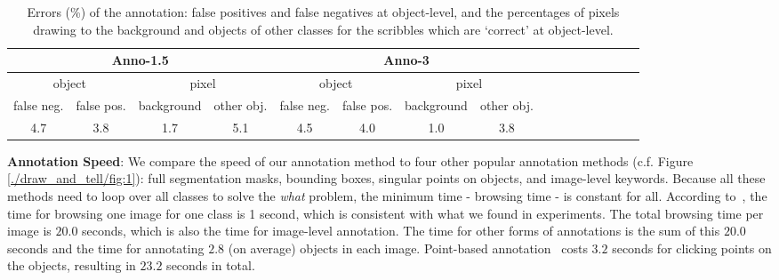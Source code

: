 \begin{table}[tb] %
\setlength\tabcolsep{1mm}
   \centering \small
  \begin{tabular}{|c|c|c|c|c|c|c|c|c|c|c|c|c|c|c|c|}  
    \hline \multicolumn{4}{|c|}{Anno-1.5} & \multicolumn{4}{c|}{Anno-3}  \\ \hline
     \multicolumn{2}{|c|}{object} & \multicolumn{2}{c|}{pixel} & \multicolumn{2}{c|}{object} & \multicolumn{2}{c|}{pixel} \\ \hline
      false neg. & false pos. & background  & other obj. & false neg. & false pos. & background  & other obj.   \\ \hline
     4.7   & 3.8 &     1.7          & 5.1   &  4.5   & 4.0 &     1.0            & 3.8  \\  \hline
       \end{tabular}
       \caption{Errors (\%) of the annotation: false positives and false negatives  at object-level, and the percentages of pixels drawing to the background and objects of other classes for the scribbles which are `correct' at object-level. 
}
    \label{table:anno}         
   \end{table}



\textbf{Annotation Speed}: We compare the speed of our annotation
method to four other popular annotation methods
(c.f. Figure \ref{./draw_and_tell/fig:1}): full segmentation masks, bounding boxes,
singular points on objects, and image-level keywords.  Because all these
methods need to loop over all classes to solve the \emph{what}
problem, the minimum time - browsing time - is constant for
all. According to~\citep{whatpoint}, the time for browsing one image
for one class is 1 second, which is consistent with what we found
in experiments. 
The total browsing time per image is  $20.0$ seconds, which is also the time for
image-level annotation.  The time for other forms of annotations is
the sum of this $20.0$ seconds and the time for annotating $2.8$ (on
average) objects in each image. Point-based
annotation~\citep{whatpoint} costs $3.2$ seconds for clicking points on
the objects, resulting in $23.2$ seconds in total.

